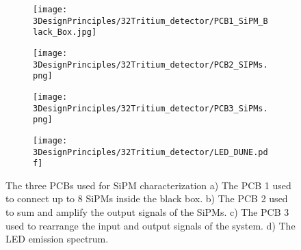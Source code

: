 \begin{figure}
\centering
    \begin{subfigure}[b]{0.5\textwidth}
    \centering
    \texttt{[image: 3DesignPrinciples/32Tritium\_detector/PCB1\_SiPM\_Black\_Box.jpg]}  
    \caption{\label{subfig:PCB1}}
    \end{subfigure}
    \hfill
    \begin{subfigure}[b]{0.45\textwidth}
    \centering
    \texttt{[image: 3DesignPrinciples/32Tritium\_detector/PCB2\_SIPMs.png]}  
    \caption{\label{subfig:PCB2}}
    \end{subfigure}
    \hfill
    \begin{subfigure}[b]{0.4\textwidth}
    \centering
    \texttt{[image: 3DesignPrinciples/32Tritium\_detector/PCB3\_SiPMs.png]}  
    \caption{\label{subfig:PCB3}}
    \end{subfigure}
    \hfill
    \begin{subfigure}[b]{0.5\textwidth}
    \centering
    \texttt{[image: 3DesignPrinciples/32Tritium\_detector/LED\_DUNE.pdf]}  
    \caption{\label{subfig:LEDSpectrum}}
    \end{subfigure}
 \caption{The three PCBs used for SiPM characterization a) The PCB 1 used to connect up to 8 SiPMs inside the black box. b) The PCB 2 used to sum and amplify the output signals of the SiPMs. c) The PCB 3 used to rearrange the input and output signals of the system. d) The LED emission spectrum.}
 \label{fig:PCBs_LEDSpectrum}
\end{figure}